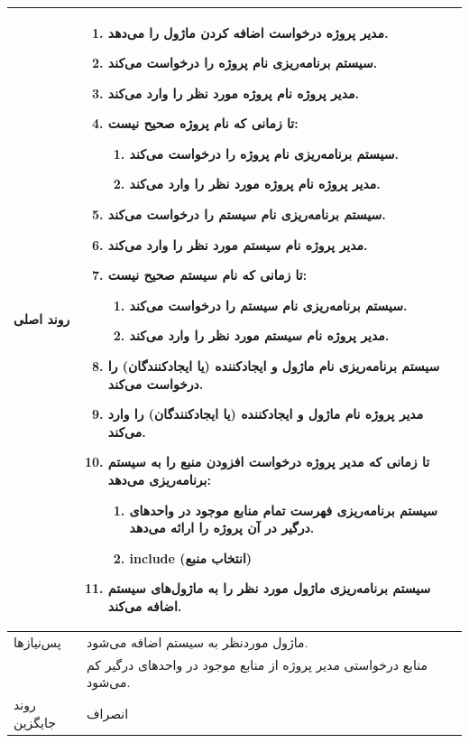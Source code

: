 \begin{table}[H]
\begin{tabular}{|p{3cm}|p{10cm}|}
		
		روند اصلی &
		\begin{enumerate}[topsep=0cm,leftmargin=0.5cm]
			\item  مدیر پروژه درخواست اضافه کردن ماژول را می‌دهد.
			\item سیستم برنامه‌ریزی نام پروژه را درخواست می‌کند.
			\item مدیر پروژه نام پروژه مورد نظر را وارد می‌کند. 
			\item تا زمانی که نام پروژه صحیح نیست:
			\begin{enumerate}[topsep=0cm,leftmargin=0.5cm]
				\item سیستم برنامه‌ریزی نام پروژه را درخواست می‌کند.
				\item مدیر پروژه نام پروژه‌ مورد نظر را وارد می‌کند.
			\end{enumerate}
			\item  سیستم برنامه‌ریزی نام سیستم را درخواست می‌کند.
			\item  مدیر پروژه نام سیستم مورد نظر را وارد می‌کند. 
			\item  تا زمانی که نام سیستم صحیح نیست:
			\begin{enumerate}[topsep=0cm,leftmargin=0.5cm]
				\item سیستم برنامه‌ریزی نام سیستم را درخواست می‌کند.
				\item مدیر پروژه نام سیستم مورد نظر را وارد می‌کند.
			\end{enumerate}
			\item  سیستم برنامه‌ریزی نام ماژول و ایجادکننده (یا ایجادکنندگان)  را درخواست می‌کند.
			\item مدیر پروژه نام ماژول و ایجادکننده (یا ایجادکنندگان) را وارد می‌کند.
			\item تا زمانی که مدیر پروژه درخواست افزودن منبع را به سیستم برنامه‌ریزی می‌دهد:
			\begin{enumerate}[topsep=0cm,leftmargin=0.5cm]
				\item سیستم برنامه‌ریزی فهرست تمام منابع موجود در واحدهای درگیر در آن پروژه را ارائه می‌دهد.
				\item include (انتخاب منبع)
			\end{enumerate}
			\item سیستم برنامه‌ریزی ماژول مورد نظر را به ماژول‌های سیستم اضافه می‌کند.
		\end{enumerate} \\
		\hline
		
		پس‌نیازها &
		ماژول موردنظر به سیستم اضافه می‌شود. \\
		& منابع درخواستی مدیر پروژه از منابع موجود در واحدهای درگیر کم می‌شود.\\
		
		\hline
		
		روند جایگزین
		& انصراف \\
		\hline
		
	\end{tabular}
\end{table}


